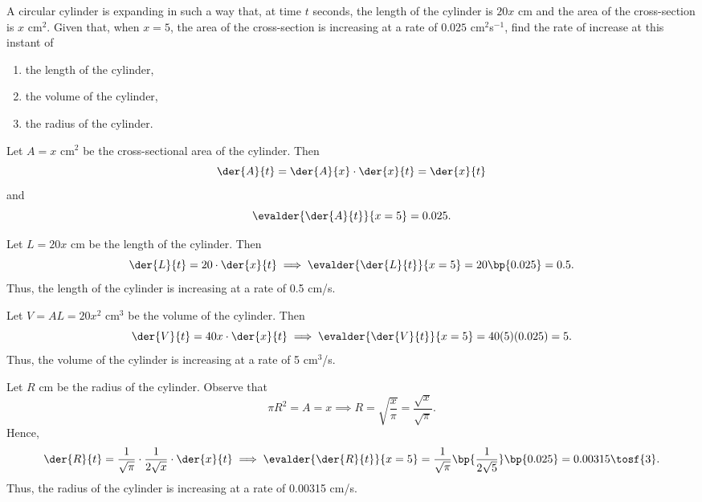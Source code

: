 \begin{problem}
    A circular cylinder is expanding in such a way that, at time $t$ seconds, the length of the cylinder is $20x$ cm and the area of the cross-section is $x$ cm$^2$. Given that, when $x=5$, the area of the cross-section is increasing at a rate of $0.025$ cm$^2$s$^{-1}$, find the rate of increase at this instant of

    \begin{enumerate}
        \item the length of the cylinder,
        \item the volume of the cylinder,
        \item the radius of the cylinder.
    \end{enumerate}
\end{problem}
\begin{solution}
    Let $A = x$ cm$^2$ be the cross-sectional area of the cylinder. Then \[\der{A}{t} = \der{A}{x} \cdot\der{x}{t} = \der{x}{t}\] and \[\evalder{\der{A}{t}}{x=5} = 0.025.\]

    \begin{ppart}
        Let $L = 20x$ cm be the length of the cylinder. Then \[\der{L}{t} = 20\cdot \der{x}{t} \implies \evalder{\der{L}{t}}{x=5} =  20\bp{0.025} = 0.5.\] Thus, the length of the cylinder is increasing at a rate of 0.5 cm/s.
    \end{ppart}
    \begin{ppart}
        Let $V = AL = 20x^2$ cm$^3$ be the volume of the cylinder. Then \[\der{V}{t} = 40x \cdot \der{x}{t} \implies \evalder{\der{V}{t}}{x=5} = 40(5)(0.025) = 5.\] Thus, the volume of the cylinder is increasing at a rate of 5 cm$^3$/s.
    \end{ppart}
    \begin{ppart}
        Let $R$ cm be the radius of the cylinder. Observe that \[\pi R^2 = A = x \implies R = \sqrt{\frac{x}\pi}= \frac{\sqrt{x}}{\sqrt\pi}.\] Hence, \[\der{R}{t} = \frac{1}{\sqrt\pi} \cdot \frac1{2\sqrt{x}} \cdot \der{x}{t} \implies \evalder{\der{R}{t}}{x=5} = \frac{1}{\sqrt\pi} \bp{\frac1{2\sqrt{5}}} \bp{0.025} = 0.00315 \tosf{3}.\] Thus, the radius of the cylinder is increasing at a rate of 0.00315 cm/s.
    \end{ppart}
\end{solution}


